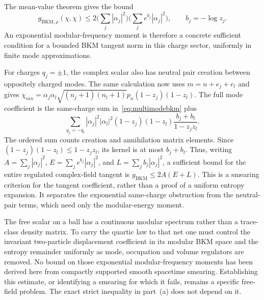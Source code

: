 The mean-value theorem gives the bound
\[
g_{\mathrm{BKM},\rho}(\chi,\chi)
\le 2\Big(\sum_j|\alpha_j|^2\Big)
       \Big(\sum_j e^{b_j}|\alpha_j|^2\Big),\qquad b_j=-\log z_j.
\]
An exponential modular-frequency moment is therefore a concrete sufficient condition
for a bounded BKM tangent norm in this charge sector, uniformly in finite mode
approximations.

For charges \(q_j=\pm1\), the complex scalar also has neutral pair creation between
oppositely charged modes. The same calculation now uses \(m=n+e_j+e_l\) and gives
\(\chi_{mn}=\alpha_j\alpha_l\sqrt{(n_j+1)(n_l+1)}p_n(1-z_j)(1-z_l)\).
The full mode coefficient is the same-charge sum in~\eqref{eq:multimodebkm} plus
\[
\sum_{q_j=-q_l}|\alpha_j|^2|\alpha_l|^2
 (1-z_j)(1-z_l)\frac{b_j+b_l}{1-z_jz_l}.
\]
The ordered sum counts creation and annihilation matrix elements. Since
\((1-z_j)(1-z_l)\le1-z_jz_l\), its kernel is at most \(b_j+b_l\).
Thus, writing \(A=\sum_j|\alpha_j|^2\), \(E=\sum_je^{b_j}|\alpha_j|^2\), and
\(L=\sum_jb_j|\alpha_j|^2\), a sufficient bound for the entire regulated complex-field
tangent is \(g_{\mathrm{BKM}}\le2A(E+L)\).
This is a smearing criterion for the tangent coefficient, rather than a proof of a
uniform entropy expansion. It separates the exponential same-charge obstruction
from the neutral-pair terms, which need only the modular-energy moment.

The free scalar on a ball has a continuous modular spectrum rather than a trace-class
density matrix. To carry the quartic law to that net one must control the invariant
two-particle displacement coefficient in its modular BKM space and the entropy remainder
uniformly as mode, occupation and volume regulators are removed. No bound on those
exponential modular-frequency moments has been derived here from compactly supported
smooth spacetime smearing. Establishing this estimate, or identifying a smearing for which it fails, remains
a specific free-field problem. The exact strict inequality in part~(a) does not depend on it.

